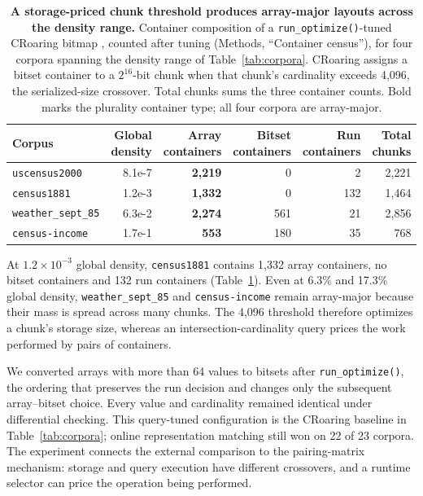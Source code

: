 \begin{table}[!t]
\footnotesize
\setlength{\tabcolsep}{6pt}
\renewcommand\arraystretch{1.05}
\centering
\caption{\textbf{A storage-priced chunk threshold produces array-major layouts across the density
range.}
Container composition of a \texttt{run\_optimize()}-tuned CRoaring bitmap
\cite{chambi2016roaring,lemire2018roaring}, counted after tuning (Methods, ``Container census''), for
four corpora spanning the density range of Table~\ref{tab:corpora}. CRoaring assigns a bitset
container to a $2^{16}$-bit chunk when that chunk's cardinality exceeds 4,096, the serialized-size
crossover. Total chunks sums the three container counts. Bold marks the plurality container type;
all four corpora are array-major.}
\label{tab:census}
\begin{tabular}{@{}l r r r r r@{}}
\toprule
Corpus & {Global density} & {Array containers} & {Bitset containers} & {Run containers} & {Total chunks} \\
\midrule
\texttt{uscensus2000}   & {8.1e-7} & {\textbf{2{,}219}} & {0} & {2} & {2{,}221} \\
\texttt{census1881}     & {1.2e-3} & {\textbf{1{,}332}} & {0} & {132} & {1{,}464} \\
\texttt{weather\_sept\_85} & {6.3e-2} & {\textbf{2{,}274}} & {561} & {21} & {2{,}856} \\
\texttt{census-income}  & {1.7e-1} & {\textbf{553}} & {180} & {35} & {768} \\
\bottomrule
\end{tabular}
\end{table}

At $1.2\times10^{-3}$ global density, \texttt{census1881} contains 1,332 array containers, no bitset
containers and 132 run containers (Table~\ref{tab:census}). Even at 6.3\% and 17.3\% global density,
\texttt{weather\_sept\_85} and \texttt{census-income} remain array-major because their mass is spread
across many chunks. The 4,096 threshold therefore optimizes a chunk's storage size, whereas an
intersection-cardinality query prices the work performed by pairs of containers.

We converted arrays with more than 64 values to bitsets after \texttt{run\_optimize()}, the ordering
that preserves the run decision and changes only the subsequent array--bitset choice. Every value and
cardinality remained identical under differential checking. This query-tuned configuration is the
CRoaring baseline in Table~\ref{tab:corpora}; online representation matching still won on 22 of 23
corpora. The experiment connects the external comparison to the pairing-matrix mechanism: storage
and query execution have different crossovers, and a runtime selector can price the operation being
performed.

